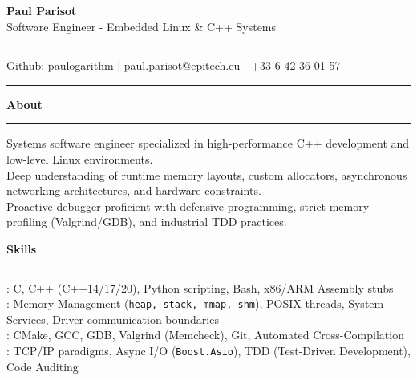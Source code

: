 \documentclass[9pt]{extarticle}
\begin{document}
\begin{center}
    {\huge\bfseries Paul Parisot}
    \\[10pt]
    {\Large Software Engineer - Embedded Linux \& C++ Systems}
    \\
\end{center}

\par\vspace{-10pt}
\rule{\linewidth}{0.4pt}
\par\vspace{-10pt}

\begin{center}
    Github: \href{https://github.com/paulogarithm}{paulogarithm} 
    \quad | \quad 
    \href{mailto:paul.parisot@epitech.eu}{paul.parisot@epitech.eu} - +33 6 42 36 01 57
\end{center}

\par\vspace{-15pt}
\rule{\linewidth}{0.4pt}
\par\vspace{5pt}

{\large\bfseries About}
\par\vspace{-8pt}
\rule{\linewidth}{0.4pt}
\par\vspace{5pt}

Systems software engineer specialized in high-performance C++ development and low-level Linux environments. \\
Deep understanding of runtime memory layouts, custom allocators, asynchronous networking architectures, and hardware constraints. \\
Proactive debugger proficient with defensive programming, strict memory profiling (Valgrind/GDB), and industrial TDD practices.

\par\vspace{5pt}

{\large\bfseries Skills}
\par\vspace{-8pt}
\rule{\linewidth}{0.4pt}
\par\vspace{5pt}

\hspace*{5pt}{\bfseries Core Systems}: C, C++ (C++14/17/20), Python scripting, Bash, x86/ARM Assembly stubs \\
\hspace*{5pt}{\bfseries Embedded Linux}: Memory Management (\texttt{heap, stack, mmap, shm}), POSIX threads, System Services, Driver communication boundaries \\
\hspace*{5pt}{\bfseries Tooling \& Toolchains}: CMake, GCC, GDB, Valgrind (Memcheck), Git, Automated Cross-Compilation \\
\hspace*{5pt}{\bfseries Networking \& Quality}: TCP/IP paradigms, Async I/O (\texttt{Boost.Asio}), TDD (Test-Driven Development), Code Auditing
\end{document}
